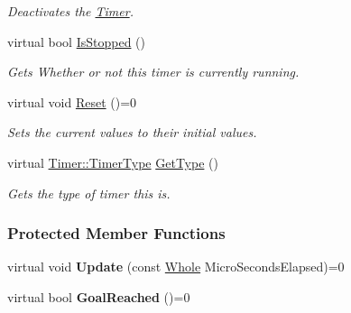 \begin{DoxyCompactItemize}
\begin{DoxyCompactList}\small\item\em Deactivates the \hyperlink{classphys_1_1Timer}{Timer}. \item\end{DoxyCompactList}\item 
\hypertarget{classphys_1_1Timer_a3cdb46639055107c23c3de971d913ec1}{
virtual bool \hyperlink{classphys_1_1Timer_a3cdb46639055107c23c3de971d913ec1}{IsStopped} ()}
\label{d3/d83/classphys_1_1Timer_a3cdb46639055107c23c3de971d913ec1}

\begin{DoxyCompactList}\small\item\em Gets Whether or not this timer is currently running. \item\end{DoxyCompactList}\item 
\hypertarget{classphys_1_1Timer_a6010a6dab70b542c3e9d5a09caa422f7}{
virtual void \hyperlink{classphys_1_1Timer_a6010a6dab70b542c3e9d5a09caa422f7}{Reset} ()=0}
\label{d3/d83/classphys_1_1Timer_a6010a6dab70b542c3e9d5a09caa422f7}

\begin{DoxyCompactList}\small\item\em Sets the current values to their initial values. \item\end{DoxyCompactList}\item 
virtual \hyperlink{classphys_1_1Timer_aacbbca9cc5543fc8414de59cd085c1c1}{Timer::TimerType} \hyperlink{classphys_1_1Timer_af0eaa87bf3074047db36ba1c6fd33c70}{GetType} ()
\begin{DoxyCompactList}\small\item\em Gets the type of timer this is. \item\end{DoxyCompactList}\end{DoxyCompactItemize}
\subsubsection*{Protected Member Functions}
\begin{DoxyCompactItemize}
\item 
\hypertarget{classphys_1_1Timer_a45d7e290f9cb8c03f2376e48ff794f24}{
virtual void {\bfseries Update} (const \hyperlink{namespacephys_a460f6bc24c8dd347b05e0366ae34f34a}{Whole} MicroSecondsElapsed)=0}
\label{d3/d83/classphys_1_1Timer_a45d7e290f9cb8c03f2376e48ff794f24}

\item 
\hypertarget{classphys_1_1Timer_a636d546064abe43b1c549efaca777613}{
virtual bool {\bfseries GoalReached} ()=0}
\label{d3/d83/classphys_1_1Timer_a636d546064abe43b1c549efaca777613}

\end{DoxyCompactItemize}
